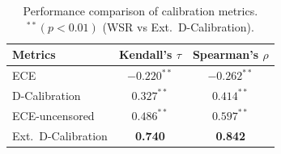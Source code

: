 \begin{table}[htbp]
\centering
\caption{Performance comparison of calibration metrics. $^{**}(p<0.01)$ (WSR vs Ext.\ D-Calibration).}
\begin{tabular}{lcc}
\toprule
\textbf{Metrics} & \textbf{Kendall's $\tau$} & \textbf{Spearman's $\rho$} \\
\midrule
ECE                    & $-0.220^{**}$ & $-0.262^{**}$ \\
D-Calibration          &  $0.327^{**}$ &  $0.414^{**}$ \\
ECE-uncensored         &  $0.486^{**}$ &  $0.597^{**}$ \\
Ext.\ D-Calibration    &  \textbf{0.740} & \textbf{0.842} \\
\bottomrule
\end{tabular}
\label{table:table1}
\end{table}